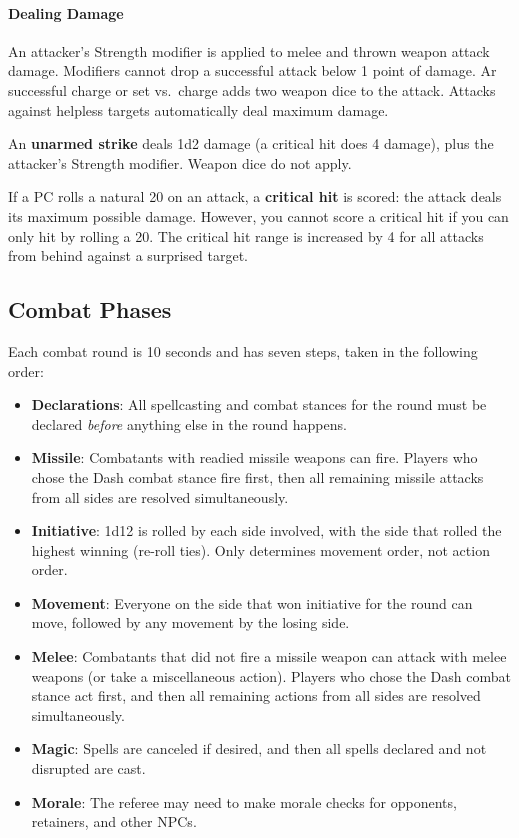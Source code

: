 \documentclass{article}
\begin{document}
\begin{multicols}{2}
\paragraph{Dealing Damage}\label{dealing-damage}

An attacker's Strength modifier is applied to melee and thrown weapon
attack damage. Modifiers cannot drop a successful attack below 1 point
of damage. Ar successful charge or set vs.~charge adds two weapon dice
to the attack. Attacks against helpless targets automatically deal
maximum damage.

An \textbf{unarmed strike} deals 1d2 damage (a critical hit does 4
damage), plus the attacker's Strength modifier. Weapon dice do not
apply.

If a PC rolls a natural 20 on an attack, a \textbf{critical hit} is
scored: the attack deals its maximum possible damage. However, you
cannot score a critical hit if you can only hit by rolling a 20. The
critical hit range is increased by 4 for all attacks from behind against
a surprised target.

\subsection{Combat Phases}\label{combat-phases}

Each combat round is 10 seconds and has seven steps, taken in the
following order:

\begin{itemize}
\tightlist
\item
  \textbf{Declarations}: All spellcasting and combat stances for the
  round must be declared \emph{before} anything else in the round
  happens.
\item
  \textbf{Missile}: Combatants with readied missile weapons can fire.
  Players who chose the Dash combat stance fire first, then all
  remaining missile attacks from all sides are resolved simultaneously.
\item
  \textbf{Initiative}: 1d12 is rolled by each side involved, with the
  side that rolled the highest winning (re-roll ties). Only determines
  movement order, not action order.
\item
  \textbf{Movement}: Everyone on the side that won initiative for the
  round can move, followed by any movement by the losing side.
\item
  \textbf{Melee}: Combatants that did not fire a missile weapon can
  attack with melee weapons (or take a miscellaneous action). Players
  who chose the Dash combat stance act first, and then all remaining
  actions from all sides are resolved simultaneously.
\item
  \textbf{Magic}: Spells are canceled if desired, and then all spells
  declared and not disrupted are cast.
\item
  \textbf{Morale}: The referee may need to make morale checks for
  opponents, retainers, and other NPCs.
\end{itemize}


\end{multicols}
\end{document}

